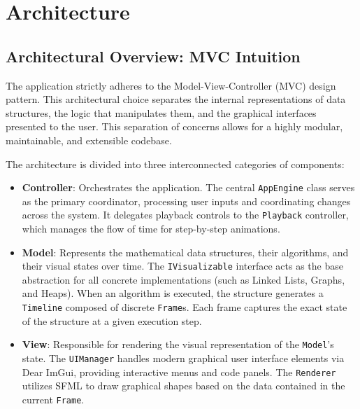 \section{Architecture}

\usetikzlibrary{fit,backgrounds, calc, shapes.multipart, shapes.geometric, arrows.meta, positioning}

\subsection{Architectural Overview: MVC Intuition}

The application strictly adheres to the Model-View-Controller (MVC) design pattern. This architectural choice separates the internal representations of data structures, the logic that manipulates them, and the graphical interfaces presented to the user. This separation of concerns allows for a highly modular, maintainable, and extensible codebase.

The architecture is divided into three interconnected categories of components:
\begin{itemize}
    \item \textbf{Controller}: Orchestrates the application. The central \texttt{AppEngine} class serves as the primary coordinator, processing user inputs and coordinating changes across the system. It delegates playback controls to the \texttt{Playback} controller, which manages the flow of time for step-by-step animations.
    \item \textbf{Model}: Represents the mathematical data structures, their algorithms, and their visual states over time. The \texttt{IVisualizable} interface acts as the base abstraction for all concrete implementations (such as Linked Lists, Graphs, and Heaps). When an algorithm is executed, the structure generates a \texttt{Timeline} composed of discrete \texttt{Frame}s. Each frame captures the exact state of the structure at a given execution step.
    \item \textbf{View}: Responsible for rendering the visual representation of the \texttt{Model}'s state. The \texttt{UIManager} handles modern graphical user interface elements via Dear ImGui, providing interactive menus and code panels. The \texttt{Renderer} utilizes SFML to draw graphical shapes based on the data contained in the current \texttt{Frame}.
\end{itemize}

